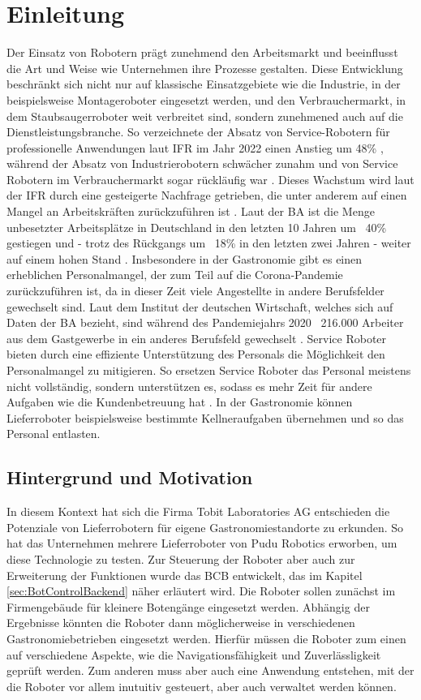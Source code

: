 \section{Einleitung}
Der Einsatz von Robotern prägt zunehmend den Arbeitsmarkt und beeinflusst die Art und Weise wie Unternehmen ihre Prozesse gestalten. Diese Entwicklung beschränkt sich nicht nur auf klassische Einsatzgebiete wie die Industrie, in der beispielsweise Montageroboter eingesetzt werden, und den Verbrauchermarkt, in dem Staubsaugerroboter weit verbreitet sind, sondern zunehmened auch auf die Dienstleistungsbranche. So verzeichnete der Absatz von Service-Robotern für professionelle Anwendungen laut \ac{IFR} im Jahr 2022 einen Anstieg um 48\% \cite{IFR2023}, während der Absatz von Industrierobotern schwächer zunahm \cite[S.~9]{WorldRobotics2023} und von Service Robotern im Verbrauchermarkt sogar rückläufig war \cite[S.~37]{WorldRobotics2023}. Dieses Wachstum wird laut der \ac{IFR} durch eine gesteigerte Nachfrage getrieben, die unter anderem auf einen Mangel an Arbeitskräften zurückzuführen ist \cite[S.~33-34]{WorldRobotics2023}. Laut der \ac{BA} ist die Menge unbesetzter Arbeitsplätze in Deutschland in den letzten 10 Jahren um ~40\% gestiegen und - trotz des Rückgangs um ~18\% in den letzten zwei Jahren - weiter auf einem hohen Stand \cite{BA2024}. Insbesondere in der Gastronomie gibt es einen erheblichen Personalmangel, der zum Teil auf die Corona-Pandemie zurückzuführen ist, da in dieser Zeit viele Angestellte in andere Berufsfelder gewechselt sind. Laut dem Institut der deutschen Wirtschaft, welches sich auf Daten der \ac{BA} bezieht, sind während des Pandemiejahrs 2020 ~216.000 Arbeiter aus dem Gastgewerbe in ein anderes Berufsfeld gewechselt \cite[S.~1]{Jansen2022}. Service Roboter bieten durch eine effiziente Unterstützung des Personals die Möglichkeit den Personalmangel zu mitigieren. So ersetzen Service Roboter das Personal meistens nicht vollständig, sondern unterstützen es, sodass es mehr Zeit für andere Aufgaben wie die Kundenbetreuung hat \cite[S.~271-272]{Sprenger2015}. In der Gastronomie können Lieferroboter beispielsweise bestimmte Kellneraufgaben übernehmen und so das Personal entlasten.

\subsection{Hintergrund und Motivation}
In diesem Kontext hat sich die Firma Tobit Laboratories AG entschieden die Potenziale von Lieferrobotern für eigene Gastronomiestandorte zu erkunden. So hat das Unternehmen mehrere Lieferroboter von Pudu Robotics erworben, um diese Technologie zu testen. Zur Steuerung der Roboter aber auch zur Erweiterung der Funktionen wurde das \ac{BCB} entwickelt, das im Kapitel \ref{sec:BotControlBackend} näher erläutert wird. Die Roboter sollen zunächst im Firmengebäude für kleinere Botengänge eingesetzt werden. Abhängig der Ergebnisse könnten die Roboter dann möglicherweise in verschiedenen Gastronomiebetrieben eingesetzt werden. Hierfür müssen die Roboter zum einen auf verschiedene Aspekte, wie die Navigationsfähigkeit und Zuverlässligkeit geprüft werden. Zum anderen muss aber auch eine Anwendung entstehen, mit der die Roboter vor allem inutuitiv gesteuert, aber auch verwaltet werden können.

